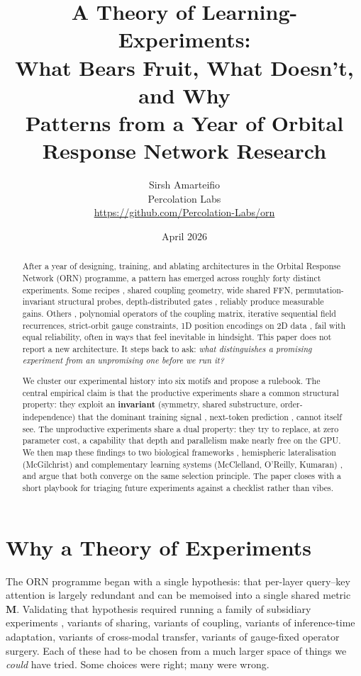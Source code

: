 \documentclass[11pt, a4paper]{article}
\title{%
    \textbf{A Theory of Learning-Experiments:}\\[4pt]
    \Large What Bears Fruit, What Doesn't, and Why\\[2pt]
    \large Patterns from a Year of Orbital Response Network Research%
}
\author{%
    Sirsh Amarteifio\\
    {\small Percolation Labs}\\
    {\small \url{https://github.com/Percolation-Labs/orn}}%
}
\date{April 2026}
\newcommand{\M}{\mathbf{M}}
\begin{document}
\maketitle

\begin{abstract}
After a year of designing, training, and ablating architectures in the Orbital Response Network (ORN) programme, a pattern has emerged across roughly forty distinct experiments. Some recipes ,  shared coupling geometry, wide shared FFN, permutation-invariant structural probes, depth-distributed gates ,  reliably produce measurable gains. Others ,  polynomial operators of the coupling matrix, iterative sequential field recurrences, strict-orbit gauge constraints, 1D position encodings on 2D data ,  fail with equal reliability, often in ways that feel inevitable in hindsight. This paper does not report a new architecture. It steps back to ask: \emph{what distinguishes a promising experiment from an unpromising one before we run it?}

We cluster our experimental history into six motifs and propose a rulebook. The central empirical claim is that the productive experiments share a common structural property: they exploit an \textbf{invariant} (symmetry, shared substructure, order-independence) that the dominant training signal ,  next-token prediction ,  cannot itself see. The unproductive experiments share a dual property: they try to replace, at zero parameter cost, a capability that depth and parallelism make nearly free on the GPU. We then map these findings to two biological frameworks ,  hemispheric lateralisation (McGilchrist) and complementary learning systems (McClelland, O'Reilly, Kumaran) ,  and argue that both converge on the same selection principle. The paper closes with a short playbook for triaging future experiments against a checklist rather than vibes.
\end{abstract}

\tableofcontents

\section{Why a Theory of Experiments}

The ORN programme began with a single hypothesis: that per-layer query--key attention is largely redundant and can be memoised into a single shared metric $\M$. Validating that hypothesis required running a family of subsidiary experiments ,  variants of sharing, variants of coupling, variants of inference-time adaptation, variants of cross-modal transfer, variants of gauge-fixed operator surgery. Each of these had to be chosen from a much larger space of things we \emph{could} have tried. Some choices were right; many were wrong.
\end{document}
